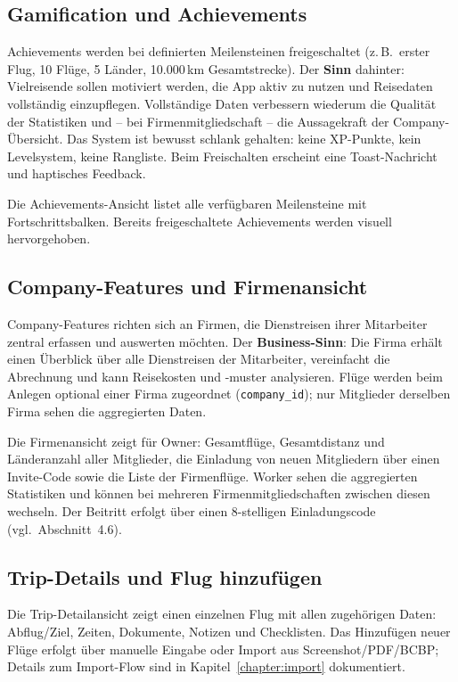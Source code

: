 \subsection{Gamification und Achievements}

Achievements werden bei definierten Meilensteinen freigeschaltet (z.\,B.\ erster Flug,
10 Flüge, 5 Länder, 10.000\,km Gesamtstrecke). Der \textbf{Sinn} dahinter: Vielreisende
sollen motiviert werden, die App aktiv zu nutzen und Reisedaten vollständig
einzupflegen. Vollständige Daten verbessern wiederum die Qualität der Statistiken
und -- bei Firmenmitgliedschaft -- die Aussagekraft der Company-Übersicht. Das System
ist bewusst schlank gehalten: keine XP-Punkte, kein Levelsystem, keine Rangliste.
Beim Freischalten erscheint eine Toast-Nachricht und haptisches Feedback.

Die Achievements-Ansicht listet alle verfügbaren Meilensteine mit Fortschrittsbalken.
Bereits freigeschaltete Achievements werden visuell hervorgehoben.

\subsection{Company-Features und Firmenansicht}

Company-Features richten sich an Firmen, die Dienstreisen ihrer Mitarbeiter zentral
erfassen und auswerten möchten. Der \textbf{Business-Sinn}: Die Firma erhält einen
Überblick über alle Dienstreisen der Mitarbeiter, vereinfacht die Abrechnung und
kann Reisekosten und -muster analysieren. Flüge werden beim Anlegen optional einer
Firma zugeordnet (\texttt{company\_id}); nur Mitglieder derselben Firma sehen die
aggregierten Daten.

Die Firmenansicht zeigt für Owner: Gesamtflüge,
Gesamtdistanz und Länderanzahl aller Mitglieder, die Einladung von neuen Mitgliedern
über einen Invite-Code sowie die Liste der Firmenflüge. Worker sehen die aggregierten
Statistiken und können bei mehreren Firmenmitgliedschaften zwischen diesen wechseln.
Der Beitritt erfolgt über einen 8-stelligen Einladungscode (vgl.\ Abschnitt~4.6).

\subsection{Trip-Details und Flug hinzufügen}

Die Trip-Detailansicht zeigt einen einzelnen Flug mit allen zugehörigen Daten:
Abflug/Ziel, Zeiten, Dokumente, Notizen und Checklisten. Das Hinzufügen neuer
Flüge erfolgt über manuelle Eingabe oder Import aus Screenshot/PDF/BCBP; Details
zum Import-Flow sind in Kapitel~\ref{chapter:import} dokumentiert.

